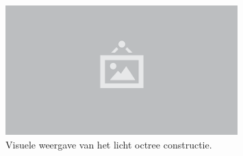 \begin{figure}
  \centering
  \includegraphics[width=0.8\textwidth]{./img/raw/placeholder.png}
  \caption{Visuele weergave van het licht octree constructie.}
  \label{fig:hs-octree-constructie}
\end{figure}
